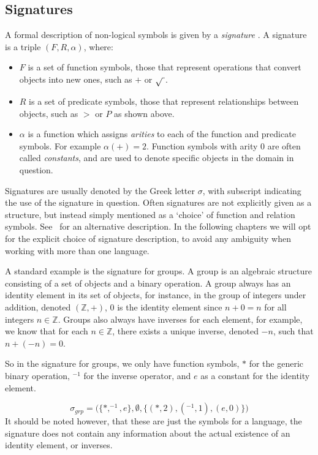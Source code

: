 \documentclass[11pt]{report}
\theoremstyle{definition}
\theoremstyle{theorem}
\theoremstyle{lemma}
\begin{document}
\subsection{Signatures}
A formal description of non-logical symbols is
given by a \emph{signature} \cite[ch. 1.1]{selinger}. A signature is a triple $(F,R,\alpha)$, where:
\begin{itemize}
\item $F$ is a set of function symbols, those that represent operations that convert objects into new ones, such as $+$ or $\sqrt{\hspace{1mm}}$.
\item $R$ is a set of predicate symbols, those that represent relationships between objects, such as $>$ or $P$ as shown above.
\item $\alpha$ is a function which assigns \emph{arities} to each of the function and predicate symbols.
For example $\alpha(+) = 2$. Function symbols with arity $0$ are often called \emph{constants}, and are used to denote specific objects in the domain in question.
\end{itemize}
Signatures are usually denoted by the Greek letter $\sigma$, with subscript indicating the use of the signature in question.
Often signatures are not explicitly given as a structure, but instead simply mentioned as a `choice' of function and relation symbols.
See~\cite{shortermodel} for an alternative description. 
In the following chapters we will opt for the explicit choice of signature description, to avoid any ambiguity when working with more than one language.

A standard example is the signature for groups.
A group is an algebraic structure consisting of a set of objects and a binary operation.
A group always has an identity element in its set of objects, for instance, in the group of integers under addition, denoted $(\mathbb{Z}, +)$, $0$ is the identity element since $n + 0 = n$ for all integers $n\in\mathbb{Z}$.
Groups also always have inverses for each element, for example, we know that for each $n\in\mathbb{Z}$, there exists a unique inverse, denoted $-n$, such that $n + (-n) = 0$.

So in the signature for groups, we only have function symbols, $*$ for the generic binary operation, $^{-1}$ for the inverse operator, and $e$ as a constant for the identity element.

$$\sigma_{\mathit{grp}} = \big(\{*,^{-1}, e\},\emptyset,\{(*, 2), (^{-1}, 1),(e,0)\}\big)$$
It should be noted however, that these are just the symbols for a language, the signature does not contain any information about the actual existence of an identity element, or inverses.
\end{document}
